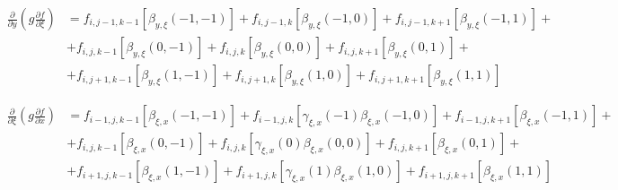 \begin{equation*}
    \begin{split}
        \frac
            {\partial}
            {\partial y}
        \left(
            g
            \frac
                {\partial f}
                {\partial \xi}
        \right)
        &
        =
        f_{i, j-1, k-1}
        \left[
            \beta_{y, \xi} \left(-1, -1\right)
        \right]
        +
        f_{i, j-1, k}
        \left[
            \beta_{y, \xi} \left(-1, 0\right)
        \right]
        +
        f_{i, j-1, k+1}
        \left[
            \beta_{y, \xi} \left(-1, 1\right)
        \right]
        +
        \\
        &
        +
        f_{i, j, k-1}
        \left[
            \beta_{y, \xi} \left(0,-1\right)
        \right]
        +
        f_{i, j, k}
        \left[
            \beta_{y, \xi} \left(0,0\right)
        \right]
        +
        f_{i, j, k+1}
        \left[
            \beta_{y, \xi} \left(0, 1\right)
        \right]
        +
        \\
        &
        +
        f_{i, j+1, k-1}
        \left[
            \beta_{y, \xi} \left(1, -1\right)
        \right]
        +
        f_{i, j+1, k}
        \left[
            \beta_{y, \xi} \left(1, 0\right)
        \right]
        +
        f_{i, j+1, k+1}
        \left[
            \beta_{y, \xi} \left(1, 1\right)
        \right]
    \end{split}
\end{equation*}

\begin{equation*}
    \begin{split}
        \frac
            {\partial}
            {\partial \xi}
        \left(
            g
            \frac
                {\partial f}
                {\partial x}
        \right)
        &
        =
        f_{i-1, j, k-1}
        \left[
            \beta_{\xi, x} \left(-1, -1\right)
        \right]
        +
        f_{i-1, j, k}
        \left[
            \gamma_{\xi, x} \left(-1\right)
            \beta_{\xi, x} \left(-1, 0\right)
        \right]
        +
        f_{i-1, j, k+1}
        \left[
            \beta_{\xi, x} \left(-1, 1\right)
        \right]
        +
        \\
        &
        +
        f_{i, j, k-1}
        \left[
            \beta_{\xi, x} \left(0,-1\right)
        \right]
        +
        f_{i, j, k}
        \left[
            \gamma_{\xi, x} \left(0\right)
            \beta_{\xi, x} \left(0,0\right)
        \right]
        +
        f_{i, j, k+1}
        \left[
            \beta_{\xi, x} \left(0, 1\right)
        \right]
        +
        \\
        &
        +
        f_{i+1, j, k-1}
        \left[
            \beta_{\xi, x} \left(1, -1\right)
        \right]
        +
        f_{i+1, j, k}
        \left[
            \gamma_{\xi, x} \left(1\right)
            \beta_{\xi, x} \left(1, 0\right)
        \right]
        +
        f_{i+1, j, k+1}
        \left[
            \beta_{\xi, x} \left(1, 1\right)
        \right]
    \end{split}
\end{equation*}

